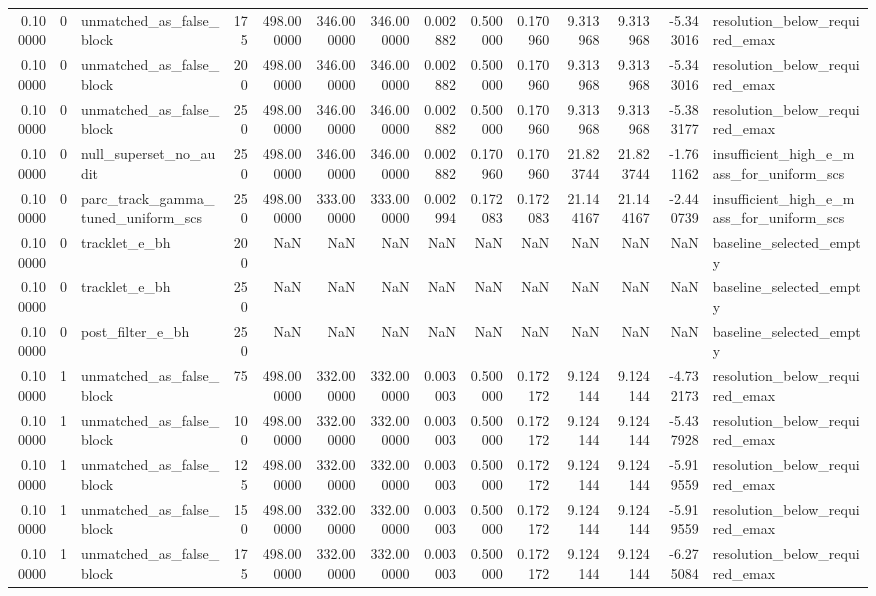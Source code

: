 \begin{tabular}{rrlrrrrrrrrrrl}
0.100000 & 0 & unmatched_as_false_block & 175 & 498.000000 & 346.000000 & 346.000000 & 0.002882 & 0.500000 & 0.170960 & 9.313968 & 9.313968 & -5.343016 & resolution_below_required_emax \\
0.100000 & 0 & unmatched_as_false_block & 200 & 498.000000 & 346.000000 & 346.000000 & 0.002882 & 0.500000 & 0.170960 & 9.313968 & 9.313968 & -5.343016 & resolution_below_required_emax \\
0.100000 & 0 & unmatched_as_false_block & 250 & 498.000000 & 346.000000 & 346.000000 & 0.002882 & 0.500000 & 0.170960 & 9.313968 & 9.313968 & -5.383177 & resolution_below_required_emax \\
0.100000 & 0 & null_superset_no_audit & 250 & 498.000000 & 346.000000 & 346.000000 & 0.002882 & 0.170960 & 0.170960 & 21.823744 & 21.823744 & -1.761162 & insufficient_high_e_mass_for_uniform_scs \\
0.100000 & 0 & parc_track_gamma_tuned_uniform_scs & 250 & 498.000000 & 333.000000 & 333.000000 & 0.002994 & 0.172083 & 0.172083 & 21.144167 & 21.144167 & -2.440739 & insufficient_high_e_mass_for_uniform_scs \\
0.100000 & 0 & tracklet_e_bh & 200 & NaN & NaN & NaN & NaN & NaN & NaN & NaN & NaN & NaN & baseline_selected_empty \\
0.100000 & 0 & tracklet_e_bh & 250 & NaN & NaN & NaN & NaN & NaN & NaN & NaN & NaN & NaN & baseline_selected_empty \\
0.100000 & 0 & post_filter_e_bh & 250 & NaN & NaN & NaN & NaN & NaN & NaN & NaN & NaN & NaN & baseline_selected_empty \\
0.100000 & 1 & unmatched_as_false_block & 75 & 498.000000 & 332.000000 & 332.000000 & 0.003003 & 0.500000 & 0.172172 & 9.124144 & 9.124144 & -4.732173 & resolution_below_required_emax \\
0.100000 & 1 & unmatched_as_false_block & 100 & 498.000000 & 332.000000 & 332.000000 & 0.003003 & 0.500000 & 0.172172 & 9.124144 & 9.124144 & -5.437928 & resolution_below_required_emax \\
0.100000 & 1 & unmatched_as_false_block & 125 & 498.000000 & 332.000000 & 332.000000 & 0.003003 & 0.500000 & 0.172172 & 9.124144 & 9.124144 & -5.919559 & resolution_below_required_emax \\
0.100000 & 1 & unmatched_as_false_block & 150 & 498.000000 & 332.000000 & 332.000000 & 0.003003 & 0.500000 & 0.172172 & 9.124144 & 9.124144 & -5.919559 & resolution_below_required_emax \\
0.100000 & 1 & unmatched_as_false_block & 175 & 498.000000 & 332.000000 & 332.000000 & 0.003003 & 0.500000 & 0.172172 & 9.124144 & 9.124144 & -6.275084 & resolution_below_required_emax \\

\end{tabular}
